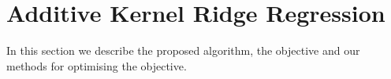 
\section{Additive Kernel Ridge Regression}
\label{sec:additiveKR}

In this section we describe the proposed algorithm, the objective and our
methods for optimising the objective.
